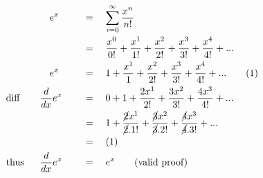 \begin{alignat*}{5}
&\,&&\quad e^x\quad&&\,=\quad\sum_{i=0}^\infty\frac{x^n}{n!}\\
&\,&&\,&&\,=\quad\frac{x^0}{0!}+\frac{x^1}{1!}+\frac{x^2}{2!}+\frac{x^3}{3!}+\frac{x^4}{4!}+...\\
&\,&&\quad e^x\quad&&\,=\quad1+\frac{x^1}{1}+\frac{x^2}{2!}+\frac{x^3}{3!}+\frac{x^4}{4!}+...\quad&&(1)\\
&\mathrm{diff}\quad&&\frac{d}{dx}e^x\quad&&\,=\quad0+1+\frac{2x^1}{2!}+\frac{3x^2}{3!}+\frac{4x^3}{4!}+...\\
&\,&&\,&&\,=\quad1+\frac{\cancel{2}x^1}{\cancel{2}.1!}+\frac{\cancel{3}x^2}{\cancel{3}.2!}+\frac{\cancel{4}x^3}{\cancel{4}.3!}+...\\
&\,&&\,&&\,=\quad(1)\\
&\mathrm{thus}&&\frac{d}{dx}e^x\quad&&\,=\quad e^x\qquad\mathrm{(valid~proof)}
\end{alignat*}
